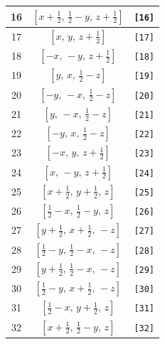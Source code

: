 \documentclass[fleqn,8pt]{jsarticle}
\begin{document}
\begin{longtable}{ccc}
16 & $\left[ x + \frac{1}{2},\, \frac{1}{2} - y,\, z + \frac{1}{2} \right]$ & {\tt [16]} \\ \hline
17 & $\left[ x,\, y,\, z + \frac{1}{2} \right]$ & {\tt [17]} \\ \hline
18 & $\left[ - x,\, - y,\, z + \frac{1}{2} \right]$ & {\tt [18]} \\ \hline
19 & $\left[ y,\, x,\, \frac{1}{2} - z \right]$ & {\tt [19]} \\ \hline
20 & $\left[ - y,\, - x,\, \frac{1}{2} - z \right]$ & {\tt [20]} \\ \hline
21 & $\left[ y,\, - x,\, \frac{1}{2} - z \right]$ & {\tt [21]} \\ \hline
22 & $\left[ - y,\, x,\, \frac{1}{2} - z \right]$ & {\tt [22]} \\ \hline
23 & $\left[ - x,\, y,\, z + \frac{1}{2} \right]$ & {\tt [23]} \\ \hline
24 & $\left[ x,\, - y,\, z + \frac{1}{2} \right]$ & {\tt [24]} \\ \hline
25 & $\left[ x + \frac{1}{2},\, y + \frac{1}{2},\, z \right]$ & {\tt [25]} \\ \hline
26 & $\left[ \frac{1}{2} - x,\, \frac{1}{2} - y,\, z \right]$ & {\tt [26]} \\ \hline
27 & $\left[ y + \frac{1}{2},\, x + \frac{1}{2},\, - z \right]$ & {\tt [27]} \\ \hline
28 & $\left[ \frac{1}{2} - y,\, \frac{1}{2} - x,\, - z \right]$ & {\tt [28]} \\ \hline
29 & $\left[ y + \frac{1}{2},\, \frac{1}{2} - x,\, - z \right]$ & {\tt [29]} \\ \hline
30 & $\left[ \frac{1}{2} - y,\, x + \frac{1}{2},\, - z \right]$ & {\tt [30]} \\ \hline
31 & $\left[ \frac{1}{2} - x,\, y + \frac{1}{2},\, z \right]$ & {\tt [31]} \\ \hline
32 & $\left[ x + \frac{1}{2},\, \frac{1}{2} - y,\, z \right]$ & {\tt [32]} \\
\end{longtable}
\end{document}
